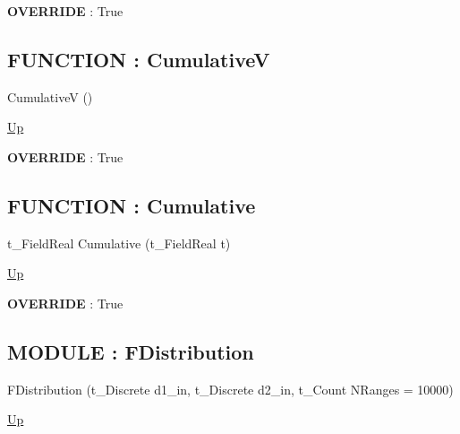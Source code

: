 \par
\par
\textbf{OVERRIDE} : True \\
\subsection*{FUNCTION : CumulativeV}
\hypertarget{ecldoc:linearregression.ols.tdistribution.cumulativev}{}
\begin{minipage}[t]{\textwidth}
\begin{flushleft}
 CumulativeV ()
\end{flushleft}
\end{minipage}
\hyperlink{ecldoc:linearregression.ols.tdistribution}{Up}

\par
\par
\textbf{OVERRIDE} : True \\
\subsection*{FUNCTION : Cumulative}
\hypertarget{ecldoc:linearregression.ols.tdistribution.cumulative}{}
\begin{minipage}[t]{\textwidth}
\begin{flushleft}
t\_FieldReal Cumulative (t\_FieldReal t)
\end{flushleft}
\end{minipage}
\hyperlink{ecldoc:linearregression.ols.tdistribution}{Up}

\par
\par
\textbf{OVERRIDE} : True \\

\subsection*{MODULE : FDistribution}
\hypertarget{ecldoc:linearregression.ols.fdistribution}{}
\begin{minipage}[t]{\textwidth}
\begin{flushleft}
 FDistribution (t\_Discrete d1\_in, t\_Discrete d2\_in, t\_Count NRanges = 10000)
\end{flushleft}
\end{minipage}
\hyperlink{ecldoc:linearregression.ols}{Up}

